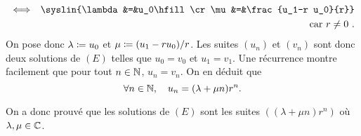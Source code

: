 \documentclass{magnolia}
\begin{document}
\begin{preuve}
\begin{itemize}
\begin{itemize}
\begin{eqnarray*}
&\ssi& \syslin{\lambda&=&u_0\hfill\cr \mu&=&\frac{u_1-r u_0}{r}}\\
&    & \text{car $r\neq 0$ .}
\end{eqnarray*}
On pose donc $\lambda\coloneqq u_0$ et $\mu\coloneqq(u_1-r u_0)/r$. Les suites $(u_n)$ et $(v_n)$ sont donc deux solutions de $(E)$ telles que $u_0=v_0$ et $u_1=v_1$. Une récurrence montre facilement que pour tout $n\in\mathbb{N}$, $u_n=v_n$. On en déduit que
\[\forall n\in\mathbb{N},\quad u_n=(\lambda +\mu n)r^n.\]
\end{itemize}
On a donc prouvé que les solutions de $(E)$ sont les suites $((\lambda+\mu n)r^n)$ où $\lambda,\mu\in\mathbb{C}$.
\end{itemize}






\end{preuve}
\end{document}

